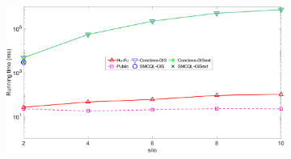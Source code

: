 \begin{figure}[t]
    \centering
    \begin{subfigure}{0.30\textwidth}
        \centering
        \includegraphics[width=\textwidth]{legend.pdf}
    \end{subfigure}
    

\end{figure}
